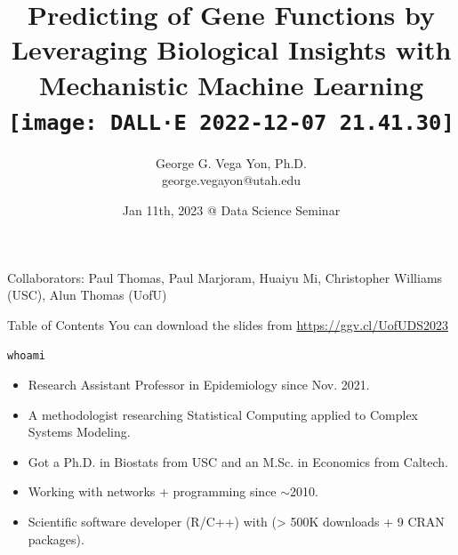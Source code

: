 \documentclass[10pt,aspectratio=169]{beamer}
\title[Predicting Gene Functions with Mech. ML]{Predicting of Gene Functions by Leveraging Biological Insights with Mechanistic Machine Learning\\\texttt{[image: DALL·E 2022-12-07 21.41.30]}\vspace{-.5cm}}
\author[\hyperlink{https://ggv.cl}{https://ggv.cl}]{George G. Vega Yon, Ph.D.\\{\small \color{darkgray}george.vegayon@utah.edu}\vspace{-.5cm}}
\institute[UofUEpi]{Division of Epidemiology @ University of Utah}
\date{Jan 11th, 2023 @ Data Science Seminar\vspace{-.5cm}}
\newcounter{frame}[frame]
\begin{document}
\begin{frame}
    \maketitle
    {\scriptsize Collaborators: Paul Thomas, Paul Marjoram, Huaiyu Mi, Christopher Williams (USC), Alun Thomas (UofU)}
\end{frame}

\begin{frame}{Table of Contents}
    \tableofcontents
    You can download the slides from \url{https://ggv.cl/UofUDS2023}
\end{frame}

\begin{frame}{\texttt{whoami}}


\begin{itemize}[<+->]
    \item Research Assistant Professor in Epidemiology since Nov. 2021.
    \item A methodologist researching Statistical Computing applied to Complex Systems Modeling.
    \item Got a Ph.D. in Biostats from USC and an M.Sc. in Economics from Caltech.
    \item Working with networks + programming since $\sim$2010.
    \item Scientific software developer (R/C++) with (> 500K downloads + 9 CRAN packages).
\end{itemize}
    
\end{frame}
\end{document}
